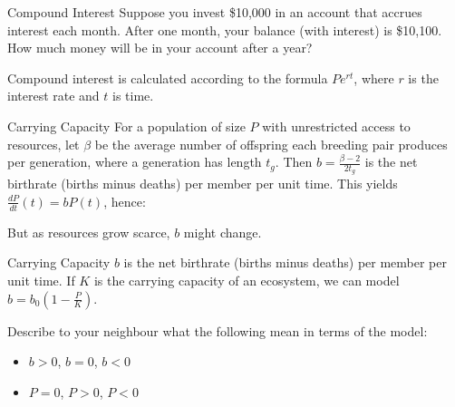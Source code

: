 \begin{frame}[t]{Compound Interest}
\AnswerSpace{}
Suppose you invest \$10,000 in an account that accrues interest each month. After one month, your balance (with interest) is \$10,100. How much money will be in your account after a year?\pause\vfill\color{answercolor}

Compound interest is calculated according to the formula $Pe^{rt}$, where $r$ is the interest rate and $t$ is time.\pause\vfill

\small
{}
\end{frame}

\begin{frame}[t]{Carrying Capacity}
For a population of size $P$ with unrestricted access to resources, let $\beta$ be the average number of offspring each breeding pair produces per generation, where a generation has length $t_g$. Then \alert<3>{$b=\frac{\beta-2}{2t_g}$ is the net birthrate (births minus deaths) per member per unit time}. This yields \alert<1>{$\frac{dP}{dt}(t) = bP(t)$}, hence:\pause
\answer{\[P(t)=P(0)e^{bt}\]}
\vfill\pause

But as resources grow scarce, $b$ might change.

\end{frame}

\begin{frame}[t]{Carrying Capacity}\AnswerSpace
$b$  is the net birthrate (births minus deaths) per member per unit time. 
If $K$ is the carrying capacity of an ecosystem, we can model $b=b_0(1-\frac{P}{K})$. 

\pause

\NowYou Describe to your neighbour what the following mean in terms of the model:
\begin{itemize}
\item $b>0$, $b=0$, $b<0$
\item $P=0$, $P>0$, $P<0$
\end{itemize}
\end{frame}

